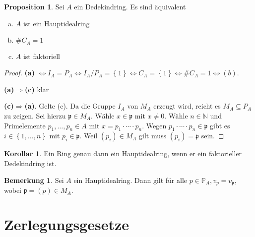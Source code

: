 \documentclass[
twoside=semi,
fontsize=12,
DIV=12, 
cleardoublepage=current,
leqno,
headings=optiontoheadandtoc, 
toc=idx
]{scrbook}
\newcommand{\N}{\mathbb{N}}
\renewcommand{\P}{\mathbb{P}}
\newcommand{\set}[1]{\left\{ #1 \right\}}
\theoremstyle{definition}
\newtheorem{bemerkung}[definition]{Bemerkung}
\newtheorem{proposition}[definition]{Proposition}
\newtheorem{korollar}[definition]{Korollar}
\begin{document}
 	\begin{proposition}\label{2.6.7}\hfill\newline
 		Sei $A$ ein Dedekindring. Es sind \"aquivalent
 		
 		\begin{enumerate}[(a)]
 			\item $A$ ist ein Hauptidealring
 			
 			\item $\#C_A = 1$
 			
 			\item $A$ ist faktoriell
 		\end{enumerate}
 	
 		\begin{proof}\hfill\newline
 			\textbf{(a)} $\Longleftrightarrow I_A = P_A \Leftrightarrow I_A / P_A = \set{1} \Longleftrightarrow C_A = \set{1} \Longleftrightarrow \#C_A = 1 \Longleftrightarrow (b)$.
 			
 			\medskip\noindent
 			\textbf{(a)$\Longrightarrow$(c)} klar
 			
 			\medskip\noindent
 			\textbf{(c)$\Longrightarrow$(a)}. Gelte (c). Da die Gruppe $I_A$ von $M_A$ erzeugt wird, reicht es $M_A \subseteq P_A$ zu zeigen. Sei hierzu $\mathfrak{p} \in M_A$. W\"ahle $x \in \mathfrak{p} $ mit $x \neq 0$. W\"ahle $n \in \N$ und Primelemente $p_1, \dots, p_n \in A$ mit $x = p_1 \cdot \cdots \cdot p_n$. Wegen $p_1 \cdot \cdots \cdot p_n \in \mathfrak{p}$ gibt es $i \in \set{1,\dots, n}$ mit $p_i \in \mathfrak{p}$. Weil $(p_i) \in M_A$ gilt muss $(p_i) = \mathfrak{p}$ sein.		
 		\end{proof}
 	\end{proposition}
 
 	\begin{korollar}\label{2.6.8}\hfill\newline
 		Ein Ring genau dann ein Hauptidealring, wenn er ein faktorieller Dedekindring ist.
 	\end{korollar}
 
 	\begin{bemerkung}\label{2.6.9}\hfill\newline
 		Sei $A$ ein Hauptidealring. Dann gilt f\"ur alle $p \in \P_A, v_p = v_\mathfrak{p}$, wobei $\mathfrak{p} = (p) \in M_A$.
 	\end{bemerkung}

	\newpage
 	\section{Zerlegungsgesetze}\thispagestyle{sectionstart}
 	
\end{document}

